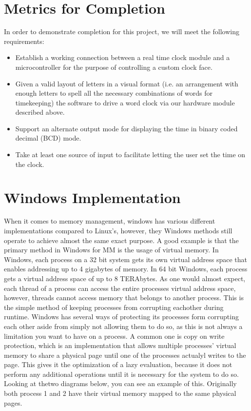 \documentclass[10pt,draftclsnofoot,onecolumn]{IEEEtran}
\begin{document}
\section{Metrics for Completion}
In order to demonstrate completion for this project, we will meet the following requirements:
\begin{itemize}
  \item Establish a working connection between a real time clock module and a
  microcontroller for the purpose of controlling a custom clock face.
  \item Given a valid layout of letters in a visual format (i.e. an arrangement
  with enough letters to spell all the necessary combinations of words for
  timekeeping) the software to drive a word clock via our hardware module
  described above.
  \item Support an alternate output mode for displaying the time in binary coded
  decimal (BCD) mode.
  \item Take at least one source of input to facilitate letting the user set the
  time on the clock.
\end{itemize}

\newpage


\section{Windows Implementation}

When it comes to memory management, windows has various different implementations
compared to Linux's, however, they Windows methods still operate to achieve
almost the same exact purpose. A good example is that the primary method in
Windows for MM is the usage of virtual memory. In Windows, each process on a 32
bit system gets its own virtual address space that enables addressing up to 4
gigabytes of memory. In 64 bit Windows, each process gets a virtual address space
of up to 8 TERAbytes. As one would almost expect, each thread of a process can
access the entire processes virtual address space, however, threads cannot access
memory that belongs to another process. This is the simple method of keeping
processes from corrupting eachother during runtime. Windows has several ways of
protecting its processes form corrupting each other aside from simply not allowing
them to do so, as this is not always a limitation you want to have on a process.
A common one is copy on write protection, which is an implementation that allows
multiple processes' virtual memory to share a physical page until one of the
processes actualyl writes to the page. This gives it the optimization of a lazy
evaluation, because it does not perform any additional operations until it is
necessary for the system to do so. Looking at thetwo diagrams below, you can
see an example of this. Originally both process 1 and 2 have their virtual
memory mapped to the same physical pages.
\end{document}
